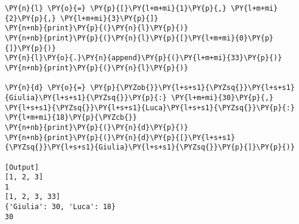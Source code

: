 \begin{Verbatim}[label=\makebox{\href{https://github.com/unipi-physics-labs/statnotes/tree/main/snippy/containers.py}{https://github.com/.../containers.py}},commandchars=\\\{\}]
\PY{n}{l} \PY{o}{=} \PY{p}{[}\PY{l+m+mi}{1}\PY{p}{,} \PY{l+m+mi}{2}\PY{p}{,} \PY{l+m+mi}{3}\PY{p}{]}
\PY{n+nb}{print}\PY{p}{(}\PY{n}{l}\PY{p}{)}
\PY{n+nb}{print}\PY{p}{(}\PY{n}{l}\PY{p}{[}\PY{l+m+mi}{0}\PY{p}{]}\PY{p}{)}
\PY{n}{l}\PY{o}{.}\PY{n}{append}\PY{p}{(}\PY{l+m+mi}{33}\PY{p}{)}
\PY{n+nb}{print}\PY{p}{(}\PY{n}{l}\PY{p}{)}

\PY{n}{d} \PY{o}{=} \PY{p}{\PYZob{}}\PY{l+s+s1}{\PYZsq{}}\PY{l+s+s1}{Giulia}\PY{l+s+s1}{\PYZsq{}}\PY{p}{:} \PY{l+m+mi}{30}\PY{p}{,} \PY{l+s+s1}{\PYZsq{}}\PY{l+s+s1}{Luca}\PY{l+s+s1}{\PYZsq{}}\PY{p}{:} \PY{l+m+mi}{18}\PY{p}{\PYZcb{}}
\PY{n+nb}{print}\PY{p}{(}\PY{n}{d}\PY{p}{)}
\PY{n+nb}{print}\PY{p}{(}\PY{n}{d}\PY{p}{[}\PY{l+s+s1}{\PYZsq{}}\PY{l+s+s1}{Giulia}\PY{l+s+s1}{\PYZsq{}}\PY{p}{]}\PY{p}{)}

[Output]
[1, 2, 3]
1
[1, 2, 3, 33]
{'Giulia': 30, 'Luca': 18}
30
\end{Verbatim}
